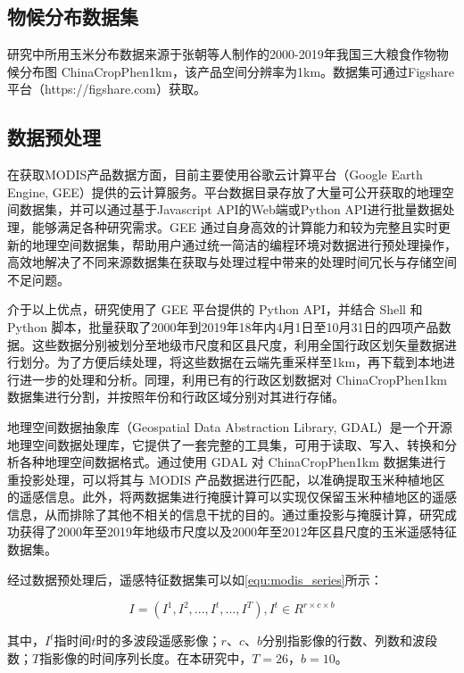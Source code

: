 \subsection{物候分布数据集}
\par 研究中所用玉米分布数据来源于张朝等人制作的2000-2019年我国三大粮食作物物候分布图 ChinaCropPhen1km\cite{luo2020chinacropphen1km}，该产品空间分辨率为1km。数据集可通过Figshare平台（https://figshare.com）获取。

\subsection{数据预处理}
\par 在获取MODIS产品数据方面，目前主要使用谷歌云计算平台（Google Earth Engine, GEE）提供的云计算服务\cite{gorelick2017google}。平台数据目录存放了大量可公开获取的地理空间数据集，并可以通过基于Javascript API的Web端或Python API进行批量数据处理，能够满足各种研究需求。GEE 通过自身高效的计算能力和较为完整且实时更新的地理空间数据集，帮助用户通过统一简洁的编程环境对数据进行预处理操作，高效地解决了不同来源数据集在获取与处理过程中带来的处理时间冗长与存储空间不足问题。

\par 介于以上优点，研究使用了 GEE 平台提供的 Python API，并结合 Shell 和 Python 脚本，批量获取了2000年到2019年18年内4月1日至10月31日的四项产品数据。这些数据分别被划分至地级市尺度和区县尺度，利用全国行政区划矢量数据进行划分。为了方便后续处理，将这些数据在云端先重采样至1km，再下载到本地进行进一步的处理和分析。同理，利用已有的行政区划数据对 ChinaCropPhen1km 数据集进行分割，并按照年份和行政区域分别对其进行存储。

\par 地理空间数据抽象库\cite{warmerdam2008geospatial}（Geospatial Data Abstraction Library, GDAL）是一个开源地理空间数据处理库，它提供了一套完整的工具集，可用于读取、写入、转换和分析各种地理空间数据格式。通过使用 GDAL 对 ChinaCropPhen1km 数据集进行重投影处理，可以将其与 MODIS 产品数据进行匹配，以准确提取玉米种植地区的遥感信息。此外，将两数据集进行掩膜计算可以实现仅保留玉米种植地区的遥感信息，从而排除了其他不相关的信息干扰的目的。通过重投影与掩膜计算，研究成功获得了2000年至2019年地级市尺度以及2000年至2012年区县尺度的玉米遥感特征数据集。

\par 经过数据预处理后，遥感特征数据集可以如\autoref{equ:modis_series}所示：

\begin{equation}
    \label{equ:modis_series}
    I=(I^1, I^2, ..., I^t, ..., I^T), I^t\in R^{r\times c\times b}
\end{equation}
\par 其中，$I^t$指时间$t$时的多波段遥感影像；$r$、$c$、$b$分别指影像的行数、列数和波段数；$T$指影像的时间序列长度。在本研究中，$T=26$，$b=10$。

